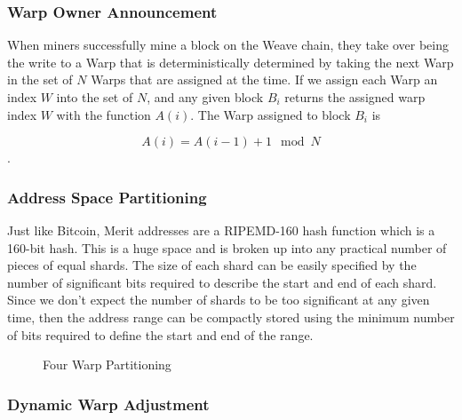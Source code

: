 \documentclass{article}
\begin{document}
\subsubsection{Warp Owner Announcement}

When miners successfully mine a block on the Weave chain, they take over being
the write to a Warp that is deterministically determined by taking the next Warp
in the set of $N$ Warps that are assigned at the time.  If we assign each
Warp an index $W$ into the set of $N$, and any given block $B_{i}$ returns the assigned warp index $W$ with the function $A(i)$.  The Warp assigned to block $B_{i}$ is 

    $$A(i) = A(i-1)+1 \mod N$$.

\subsubsection{Address Space Partitioning}

Just like Bitcoin, Merit addresses are a RIPEMD-160 hash function which is a 160-bit
hash.  This is a huge space and is broken up into any practical number
of pieces of equal shards.  The size of each shard can be easily specified by the
number of significant bits required to describe the start and end of each shard.
Since we don't expect the number of shards to be too significant at any given time,
then the address range can be compactly stored using the minimum number of bits
required to define the start and end of the range.

\begin{figure}[H]
    \begin{center}
    \end{center}
    \caption{Four Warp Partitioning}
\end{figure}

\subsubsection{Dynamic Warp Adjustment}
\end{document}
